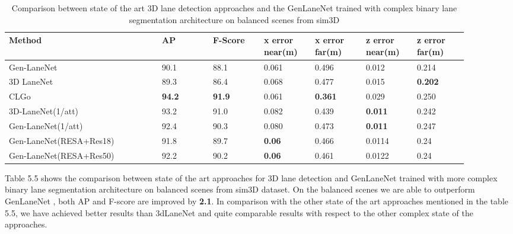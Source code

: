    \begin{table}[htbp]
    \addtolength{\tabcolsep}{-1pt}
    \begin{center}
    \caption{Comparison between state of the art 3D lane detection approaches and the GenLaneNet \cite{Guo_2018_ECCV} trained with complex binary lane segmentation architecture on balanced scenes from sim3D \cite{}}
    \begin{tabular}{|p{0.3\linewidth}|p{0.1\linewidth}|p{0.1\linewidth}|p{0.1\linewidth}|p{0.1\linewidth}|p{0.1\linewidth}|p{0.1\linewidth}|}
    \hline
        \textbf{Method} & \textbf{AP} & \textbf{F-Score} & \textbf{x error near(m)} & \textbf{x error far(m)} & \textbf{z error near(m)} & \textbf{z error far(m)} \\ \hline
        Gen-LaneNet\cite{} & 90.1 & 88.1 & 0.061 & 0.496 & 0.012 & 0.214 \\ \hline
        3D LaneNet \cite{}& 89.3 & 86.4 & 0.068 & 0.477 & 0.015 & \textbf{0.202} \\ \hline
        CLGo \cite{}& \textbf{94.2} &\textbf{ 91.9} & 0.061 & \textbf{0.361} & 0.029 & 0.250 \\ \hline
        3D-LaneNet(1/att) \cite{} &  93.2 & 91.0 & 0.082 & 0.439 & \textbf{0.011} & 0.242 \\ \hline
        Gen-LaneNet(1/att) \cite{}& 92.4 & 90.3 & 0.080 & 0.473 & \textbf{0.011} & 0.247 \\ \hline
        Gen-LaneNet(RESA+Res18) & 91.8 & 89.7 & \textbf{0.06} & 0.466 & 0.0114 & 0.24 \\ \hline
        Gen-LaneNet(RESA+Res50) & 92.2 & 90.2 &\textbf{ 0.06} & 0.461 & 0.0122 & 0.24 \\ \hline
    \end{tabular}
    \end{center}
    \end{table}
    
    Table 5.5 shows the comparison between state of the art approaches for 3D lane detection and GenLaneNet \cite{guo2020gen} trained with more complex binary lane segmentation architecture on balanced scenes from sim3D dataset\cite{}. On the balanced scenes we are able to outperform GenLaneNet \cite{guo2020gen}, both AP and F-score are improved by \textbf{2.1}. In comparison with the other state of the art approaches mentioned in the table 5.5, we have achieved better results than 3dLaneNet \cite{} and quite comparable results with respect to the other complex state of the approaches. 
        

